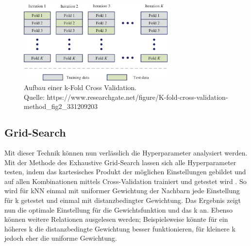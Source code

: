 \begin{figure}
    \centering
    \includegraphics[width=0.7\textwidth]{res/theory-cv}
    \caption{Aufbau einer k-Fold Cross Validation.\\ Quelle: https://www.researchgate.net/figure/K-fold-cross-validation-method\_fig2\_331209203}
    \label{fig:theory-cv}
\end{figure}

\subsection*{Grid-Search}

Mit dieser Technik können nun verlässlich die Hyperparameter analysiert werden. Mit der Methode des Exhaustive
 Grid-Search lassen sich alle Hyperparameter testen, indem das kartesisches Produkt der möglichen Einstellungen
 gebildet und auf allen Kombinationen mittels Cross-Validation trainiert und getestet wird \cite{mlGS}. So wird für
 kNN einmal mit uniformer Gewichtung der Nachbarn jede Einstellung für k getestet und einmal mit distanzbedingter
 Gewichtung. Das Ergebnis zeigt nun die optimale Einstellung für die Gewichtsfunktion und das k an. Ebenso können
 weitere Relationen ausgelesen werden; Beispielsweise könnte für ein höheres k die distanzbedingte Gewichtung besser
 funktionieren, für kleinere k jedoch eher die uniforme Gewichtung.
